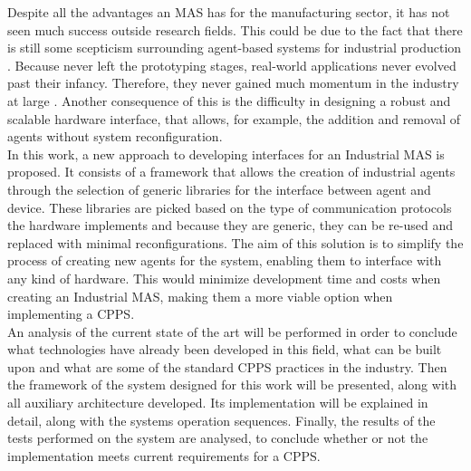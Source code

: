Despite all the advantages an \acrshort{MAS} has for the manufacturing sector, it has not seen much success outside research fields. This could be due to the fact that there is still some scepticism surrounding agent-based systems for industrial production \cite{bottling_plant_part2}. Because  never left the prototyping stages, real-world applications never evolved past their infancy. Therefore, they never gained much momentum in the industry at large \cite{karnouskos02}. Another consequence of this is the difficulty in designing a robust and scalable hardware interface, that allows, for example, the addition and removal of agents without system reconfiguration.\\

In this work, a new approach to developing interfaces for an Industrial \acrshort{MAS} is proposed. It consists of a framework that allows the creation of industrial agents through the selection of generic libraries for the interface between agent and device. These libraries are picked based on the type of communication protocols the hardware implements and because they are generic, they can be re-used and replaced with minimal reconfigurations. The aim of this solution is to simplify the process of creating new agents for the system, enabling them to interface with any kind of hardware. This would minimize development time and costs when creating an Industrial \acrshort{MAS}, making them a more viable option when implementing a \acrshort{CPPS}.\\

An analysis of the current state of the art will be performed in order to conclude what technologies have already been developed in this field, what can be built upon and what are some of the standard \acrshort{CPPS} practices in the industry. Then the framework of the system designed for this work will be presented, along with all auxiliary architecture developed. Its implementation will be explained in detail, along with the systems operation sequences. Finally, the results of the tests performed on the system are analysed, to conclude whether or not the implementation meets current requirements for a \acrlong{CPPS}.